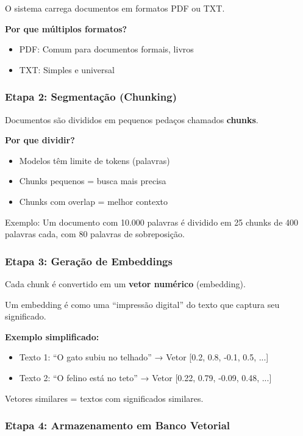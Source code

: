 \documentclass[12pt,a4paper]{article}
\begin{document}
O sistema carrega documentos em formatos PDF ou TXT.

\textbf{Por que múltiplos formatos?}
\begin{itemize}
    \item PDF: Comum para documentos formais, livros
    \item TXT: Simples e universal
\end{itemize}

\subsubsection{Etapa 2: Segmentação (Chunking)}

Documentos são divididos em pequenos pedaços chamados \textbf{chunks}.

\textbf{Por que dividir?}
\begin{itemize}
    \item Modelos têm limite de tokens (palavras)
    \item Chunks pequenos = busca mais precisa
    \item Chunks com overlap = melhor contexto
\end{itemize}

Exemplo: Um documento com 10.000 palavras é dividido em 25 chunks de 400 palavras cada, com 80 palavras de sobreposição.

\subsubsection{Etapa 3: Geração de Embeddings}

Cada chunk é convertido em um \textbf{vetor numérico} (embedding).

Um embedding é como uma ``impressão digital'' do texto que captura seu significado.

\textbf{Exemplo simplificado:}
\begin{itemize}
    \item Texto 1: ``O gato subiu no telhado'' → Vetor [0.2, 0.8, -0.1, 0.5, ...]
    \item Texto 2: ``O felino está no teto'' → Vetor [0.22, 0.79, -0.09, 0.48, ...]
\end{itemize}

Vetores similares = textos com significados similares.

\subsubsection{Etapa 4: Armazenamento em Banco Vetorial}
\end{document}
